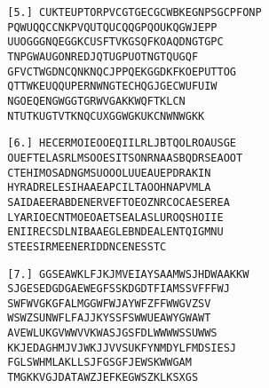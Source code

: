 \documentclass[letterpaper,11pt]{article}
\begin{document}
\begin{enumerate}
\begin{enumerate}
        \begin{verbatim}
        [5.] CUKTEUPTORPVCGTGECGCWBKEGNPSGCPFONP
        PQWUQQCCNKPVQUTQUCQQGPQOUKQGWJEPP
        UUOGGGNQEGGKCUSFTVKGSQFKOAQDNGTGPC
        TNPGWAUGONREDJQTUGPUOTNGTQUGQF
        GFVCTWGDNCQNKNQCJPPQEKGGDKFKOEPUTTOG
        QTTWKEUQQUPERNWNGTECHQGJGECWUFUIW
        NGOEQENGWGGTGRWVGAKKWQFTKLCN
        NTUTKUGTVTKNQCUXGGWGKUKCNWNWGKK
        \end{verbatim}

        \begin{verbatim}
        [6.] HECERMOIEOOEQIILRLJBTQOLROAUSGE
        OUEFTELASRLMSOOESITSONRNAASBQDRSEAOOT
        CTEHIMOSADNGMSUOOOLUUEAUEPDRAKIN
        HYRADRELESIHAAEAPCILTAOOHNAPVMLA
        SAIDAEERABDENERVEFTOEOZNRCOCAESEREA
        LYARIOECNTMOEOAETSEALASLUROQSHOIIE
        ENIIRECSDLNIBAAEGLEBNDEALENTQIGMNU
        STEESIRMEENERIDDNCENESSTC
        \end{verbatim}

        \newpage
        \begin{verbatim}
        [7.] GGSEAWKLFJKJMVEIAYSAAMWSJHDWAAKKW
        SJGESEDGDGAEWEGFSSKDGDTFIAMSSVFFFWJ
        SWFWVGKGFALMGGWFWJAYWFZFFWWGVZSV
        WSWZSUNWFLFAJJKYSSFSWWUEAWYGWAWT
        AVEWLUKGVWWVVKWASJGSFDLWWWWSSUWWS
        KKJEDAGHMJVJWKJJVVSUKFYNMDYLFMDSIESJ
        FGLSWHMLAKLLSJFGSGFJEWSKWWGAM
        TMGKKVGJDATAWZJEFKEGWSZKLKSXGS
        \end{verbatim}
        

\end{enumerate}
\end{enumerate}
\end{document}
